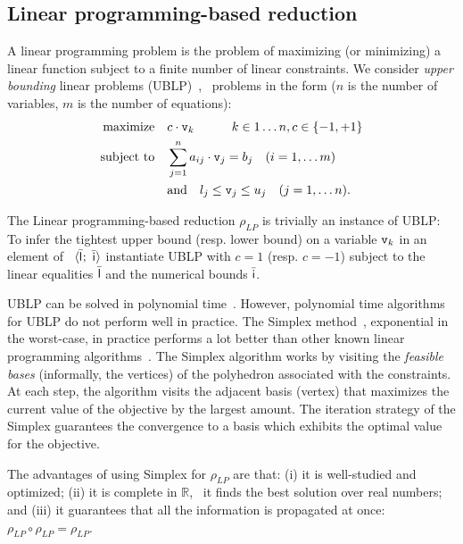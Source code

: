 \documentclass[sttt]{svjour}
\begin{document}
\subsection{Linear programming-based reduction}
A linear programming problem is the problem of maximizing (or minimizing) a linear function subject to a finite number of linear constraints.
We consider \emph{upper bounding} linear problems (UBLP)~\cite{LinearProgramming}, \ie\ problems in the form ($n$ is the number of variables, $m$ is the number of equations):
\[
\begin{aligned}
\text{maximize}  &\quad c \cdot \mathtt{v}_k \quad \quad\quad  k \in {1 \dots n}, c \in \{ -1, +1 \} \\
\text{subject to} & \quad\sum_{j=1}^n a_{ij} \cdot \mathtt{v}_j = b_j \quad (i = 1, \dots m)  \\
 & \quad \text{and} \quad l_j \leq \mathtt{v}_j \leq u_j \quad  (j = 1, \dots n). 
\end{aligned}
 \]

The Linear programming-based reduction $\rho_{LP}$ is trivially an instance of UBLP:
To infer the tightest upper bound (resp. lower bound) on a variable $\mathtt{v}_k$ in an element of \Subpoly\ $\langle \bar{\mathsf{\mathsf{l}}}_{}^{};\ \bar{\mathsf{\mathsf{i}}}_{}^{} \rangle$ instantiate UBLP with $c = 1$ (resp. $c = -1$) subject to the linear equalities $\bar{\mathsf{\mathsf{l}}}$ and the numerical bounds $\bar{\mathsf{\mathsf{i}}}$.

UBLP can be solved in polynomial time~\cite{LinearProgramming}. 
However, polynomial time algorithms for UBLP do not perform well in practice.
The Simplex method~\cite{Dantzig48}, exponential in the worst-case, in practice performs a lot better than other known linear programming algorithms~\cite{SpielmanTeng04}.
The Simplex algorithm works by visiting the \emph{feasible bases} (informally, the vertices) of the polyhedron associated with the constraints. 
At each step, the algorithm visits the adjacent basis (vertex) that maximizes the current value of the objective by the largest amount. 
The iteration strategy of the Simplex guarantees the convergence to a basis which exhibits the optimal value for the objective. 

The advantages of using Simplex for  $\rho_{LP}$ are that: (i) it is well-studied and optimized; (ii) it is complete in $\mathbb{R}$, \ie\ it finds the best solution over real numbers; and (iii) it guarantees that all the information is propagated at once: $\rho_{LP} \circ \rho_{LP} = \rho_{LP}$.
\end{document}
